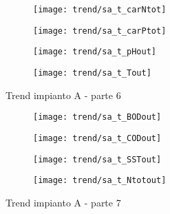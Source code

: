 \begin{sidewaysfigure}[h]\ContinuedFloat
	\renewcommand*\thesubfigure{(\arabic{subfigure})}
	\begin{subfigure}{0.49\textwidth}
		\texttt{[image: trend/sa\_t\_carNtot]}
		\caption{}
		\label{fig:sa_t_carNtot}
		\centering
	\end{subfigure}
	\begin{subfigure}{0.49\textwidth}
		\texttt{[image: trend/sa\_t\_carPtot]}
		\caption{}
		\label{fig:sa_t_carPtot}
		\centering
	\end{subfigure}

	\begin{subfigure}{0.49\textwidth}
		\texttt{[image: trend/sa\_t\_pHout]}
		\caption{}
		\label{fig:sa_t_pHout}
		\centering
	\end{subfigure}
	\begin{subfigure}{0.49\textwidth}
		\texttt{[image: trend/sa\_t\_Tout]}	
		\caption{}
		\label{fig:sa_t_Tout}
		\centering
	\end{subfigure}
	\caption{Trend impianto A - parte 6}
\end{sidewaysfigure}

\begin{sidewaysfigure}[h]\ContinuedFloat
	\renewcommand*\thesubfigure{(\arabic{subfigure})}
	\begin{subfigure}{0.49\textwidth}
		\texttt{[image: trend/sa\_t\_BODout]}
		\caption{}
		\centering
	\end{subfigure}
	\begin{subfigure}{0.49\textwidth}
		\texttt{[image: trend/sa\_t\_CODout]}
		\caption{}
		\centering
	\end{subfigure}

	\begin{subfigure}{0.49\textwidth}
		\texttt{[image: trend/sa\_t\_SSTout]}
		\caption{}
		\centering
	\end{subfigure}
	\begin{subfigure}{0.49\textwidth}
		\texttt{[image: trend/sa\_t\_Ntotout]}	
		\caption{}
		\centering
	\end{subfigure}
	\caption{Trend impianto A - parte 7}
\end{sidewaysfigure}

